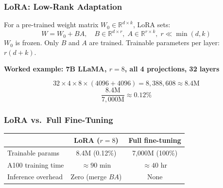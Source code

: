 \documentclass[9pt,t]{beamer}
\begin{document}
\begin{frame}
\frametitle{LoRA: Low-Rank Adaptation}

\begin{underhood}
For a pre-trained weight matrix $W_0 \in \mathbb{R}^{d\times k}$, LoRA sets:
\[
  W = W_0 + BA, \quad B \in \mathbb{R}^{d\times r},\; A \in \mathbb{R}^{r\times k},\;
  r \ll \min(d,k)
\]
$W_0$ is frozen. Only $B$ and $A$ are trained.
Trainable parameters per layer: $r(d + k)$.
\end{underhood}

\medskip
\textbf{Worked example: 7B LLaMA, $r = 8$, all 4 projections, 32 layers}

\[
  32 \times 4 \times 8 \times (4096 + 4096) = 8{,}388{,}608 \approx 8.4\text{M}
\]
\[
  \frac{8.4\text{M}}{7{,}000\text{M}} \approx 0.12\%
\]
\end{frame}

\begin{frame}
\frametitle{LoRA vs.\ Full Fine-Tuning}

\begin{center}
\begin{tabular}{lcc}
\toprule
                & LoRA ($r=8$) & Full fine-tuning \\
\midrule
Trainable params & 8.4M (0.12\%) & 7,000M (100\%) \\
A100 training time & $\approx 90$ min & $\approx 40$ hr \\
Inference overhead & Zero (merge $BA$) & None \\
\bottomrule
\end{tabular}
\end{center}
\end{frame}
\end{document}
